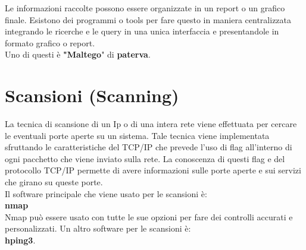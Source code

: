\documentclass[a4paper,12pt]{article}
\begin{document}
Le informazioni raccolte  possono essere organizzate in un report o un grafico finale. Esistono dei programmi o tools  per fare questo in maniera centralizzata integrando le ricerche e le query in una unica interfaccia e presentandole in formato grafico o report.
\\ Uno di questi è \textbf{"Maltego}"\cite{maltego} di \textbf{paterva}\cite{paterva}. 

\section{ Scansioni (Scanning) }

La tecnica di scansione di un Ip o di una intera rete viene effettuata per cercare le eventuali porte aperte su un sistema. Tale tecnica viene implementata sfruttando le caratteristiche del TCP/IP che prevede l'uso di flag all'interno di ogni pacchetto che viene inviato sulla rete. La conoscenza di questi flag e del protocollo TCP/IP permette di avere informazioni sulle porte aperte e sui servizi che girano su queste porte. \\
Il software principale che viene usato per le scansioni è: \\
\textbf{nmap}\cite{nmap} \\
Nmap può essere usato con tutte le sue opzioni per fare dei controlli accurati e personalizzati.
Un altro software per le scansioni è: \\
\textbf{ hping3}\cite{hping3}.
\end{document}
